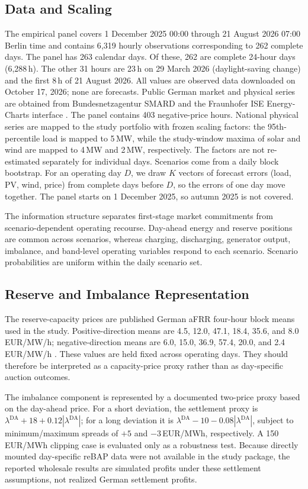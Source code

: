 \documentclass[journal,12pt,twocolumn]{IEEEtran}
\begin{document}
\subsection{Data and Scaling}
The empirical panel covers 1 December 2025 00:00 through 21 August 2026 07:00 Berlin time and contains 6{,}319 hourly observations corresponding to 262 complete days. The panel has 263 calendar days. Of these, 262 are complete 24-hour days (6{,}288\,h). The other 31 hours are 23\,h on 29 March 2026 (daylight-saving change) and the first 8\,h of 21 August 2026. All values are observed data downloaded on October 17, 2026; none are forecasts. Public German market and physical series are obtained from Bundesnetzagentur SMARD \cite{SMARD} and the Fraunhofer ISE Energy-Charts interface \cite{EnergyCharts}. The panel contains 403 negative-price hours. National physical series are mapped to the study portfolio with frozen scaling factors: the 95th-percentile load is mapped to 5\,MW, while the study-window maxima of solar and wind are mapped to 4\,MW and 2\,MW, respectively. The factors are not re-estimated separately for individual days. Scenarios come from a daily block bootstrap. For an operating day $D$, we draw $K$ vectors of forecast errors (load, PV, wind, price) from complete days before $D$, so the errors of one day move together. The panel starts on 1 December 2025, so autumn 2025 is not covered.

The information structure separates first-stage market commitments from scenario-dependent operating recourse. Day-ahead energy and reserve positions are common across scenarios, whereas charging, discharging, generator output, imbalance, and band-level operating variables respond to each scenario. Scenario probabilities are uniform within the daily scenario set.

\subsection{Reserve and Imbalance Representation}
The reserve-capacity prices are published German aFRR four-hour block means used in the study. Positive-direction means are 4.5, 12.0, 47.1, 18.4, 35.6, and 8.0\,EUR/MW/h; negative-direction means are 6.0, 15.0, 36.9, 57.4, 20.0, and 2.4\,EUR/MW/h \cite{ModoEnergy,Pexapark}. These values are held fixed across operating days. They should therefore be interpreted as a capacity-price proxy rather than as day-specific auction outcomes.

The imbalance component is represented by a documented two-price proxy based on the day-ahead price. For a short deviation, the settlement proxy is $\lambda^{\text{DA}} + 18 + 0.12|\lambda^{\text{DA}}|$; for a long deviation it is $\lambda^{\text{DA}} - 10 - 0.08|\lambda^{\text{DA}}|$, subject to minimum/maximum spreads of $+5$ and $-3$\,EUR/MWh, respectively. A 150\,EUR/MWh clipping case is evaluated only as a robustness test. Because directly mounted day-specific reBAP data were not available in the study package, the reported wholesale results are simulated profits under these settlement assumptions, not realized German settlement profits.
\end{document}
